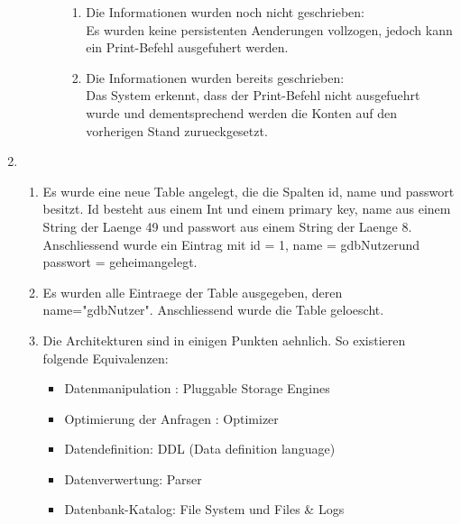 \documentclass{article}
\begin{document}
\begin{enumerate}
\begin{itemize}
\begin{enumerate}
\begin{enumerate}
                                        \item Die Informationen wurden noch nicht geschrieben: \\
                                                Es wurden keine persistenten Aenderungen vollzogen, jedoch kann ein Print-Befehl ausgefuhert werden. \\
                                        \item Die Informationen wurden bereits geschrieben: \\
                                                Das System erkennt, dass der Print-Befehl nicht ausgefuehrt wurde und dementsprechend werden die Konten auf den vorherigen Stand zurueckgesetzt.\\
                                \end{enumerate}
                        \end{enumerate}
            \end{itemize}
        \item
            \begin{enumerate}
                \item Es wurde eine neue Table angelegt, die die Spalten id, name und passwort besitzt. Id besteht aus einem Int und einem primary key, name aus einem String der Laenge 49 und passwort aus einem String der Laenge 8. Anschliessend wurde ein Eintrag mit id = 1, name = \glqq gdbNutzer\glqq und passwort = \glqq geheim\glqq angelegt.
                \item Es wurden alle Eintraege der Table ausgegeben, deren name="gdbNutzer". Anschliessend wurde die Table geloescht.
                \item Die Architekturen sind in einigen Punkten aehnlich. So existieren folgende Equivalenzen: 
                \begin{itemize}
                    \item Datenmanipulation : \glqq Pluggable Storage Engines\glqq
                    \item Optimierung der Anfragen : \glqq Optimizer \glqq
                    \item Datendefinition: \glqq DDL (Data definition language) \glqq
                    \item Datenverwertung: \glqq Parser \glqq
                    \item Datenbank-Katalog: \glqq File System \glqq und \glqq Files \& Logs \glqq
                \end{itemize}
            \end{enumerate}
    \end{enumerate}
\end{document}

